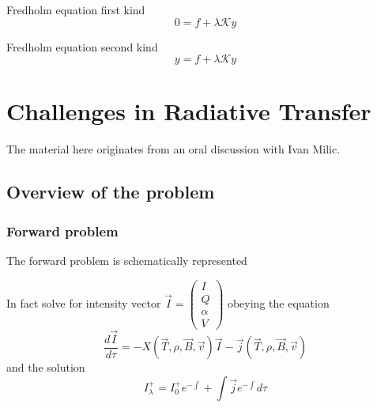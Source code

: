 \documentclass[../main/main.tex]{subfiles}
\begin{document}
Fredholm equation first kind
\begin{equation}
0 = f + \lambda \mathcal{K}y
\end{equation}

Fredholm equation second kind
\begin{equation}
y = f + \lambda \mathcal{K}y
\end{equation}

\newpage
\section{Challenges in Radiative Transfer}
The material here originates from an oral discussion with Ivan Milic. 
\subsection{Overview of the problem}
\begin{center}
\end{center}

\subsubsection*{Forward problem}
The forward problem is schematically represented
\begin{center}
\end{center}
In fact solve for intensity vector $  \vec{I} = \left( \begin{matrix}
I \\ Q \\ \alpha \\ V
\end{matrix} \right) $
obeying the equation
\begin{equation}
\frac{d\vec{I}}{d\tau} = -X(\vec{T},\rho,\vec{B},\vec{v}) \vec{I} - \vec{j}(\vec{T},\rho,\vec{B},\vec{v})
\end{equation}
and the solution 
\begin{equation}
I_{\lambda}^+ = I_{0}^+ e^{- \int} + \int\vec{j}e^{-\int} d\tau
\end{equation}
\end{document}
